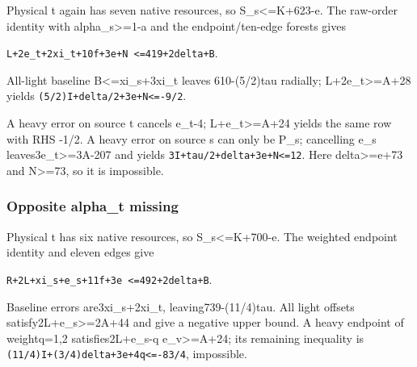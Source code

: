 \documentclass[10pt,a4paper]{article}
\theoremstyle{definition}
\begin{document}
Physical t again has seven native resources,\allowbreak{} so S\_\allowbreak{}s\textless=\allowbreak{}K+\allowbreak{}623-e.
The raw-order identity with alpha\_\allowbreak{}s\textgreater=\allowbreak{}1-a and the
endpoint/ten-edge forests gives

\texttt{L+\allowbreak{}2e\_\allowbreak{}\allowbreak{}t+\allowbreak{}2xi\_\allowbreak{}\allowbreak{}t+\allowbreak{}10f+\allowbreak{}3e+\allowbreak{}N <=\allowbreak{}419+\allowbreak{}2delta+\allowbreak{}B}.

All-light baseline B\textless=\allowbreak{}xi\_\allowbreak{}s+\allowbreak{}3xi\_\allowbreak{}t leaves 610-(5/2)tau radially;
L+\allowbreak{}2e\_\allowbreak{}t\textgreater=\allowbreak{}A+\allowbreak{}28 yields
\texttt{(5/\allowbreak{}2)I+\allowbreak{}delta/\allowbreak{}2+\allowbreak{}3e+\allowbreak{}N<=\allowbreak{}-9/\allowbreak{}2}.

A heavy error on source t cancels e\_\allowbreak{}t-4; L+\allowbreak{}e\_\allowbreak{}t\textgreater=\allowbreak{}A+\allowbreak{}24 yields
the same row with RHS -1/2. A heavy error on source s can only be P\_\allowbreak{}s;
cancelling e\_\allowbreak{}s leaves3e\_\allowbreak{}t\textgreater=\allowbreak{}3A-207 and yields
\texttt{3I+\allowbreak{}tau/\allowbreak{}2+\allowbreak{}delta+\allowbreak{}3e+\allowbreak{}N<=\allowbreak{}12}. Here
delta\textgreater=\allowbreak{}e+\allowbreak{}73 and N\textgreater=\allowbreak{}73,\allowbreak{} so it is impossible.

\hypertarget{opposite-alpha_t-missing}{%
\subsubsection{Opposite alpha\_\allowbreak{}t
missing}\label{opposite-alpha_t-missing}}

Physical t has six native resources,\allowbreak{} so S\_\allowbreak{}s\textless=\allowbreak{}K+\allowbreak{}700-e. The
weighted endpoint identity and eleven edges give

\texttt{R+\allowbreak{}2L+\allowbreak{}xi\_\allowbreak{}\allowbreak{}s+\allowbreak{}e\_\allowbreak{}\allowbreak{}s+\allowbreak{}11f+\allowbreak{}3e <=\allowbreak{}492+\allowbreak{}2delta+\allowbreak{}B}.

Baseline errors are3xi\_\allowbreak{}s+\allowbreak{}2xi\_\allowbreak{}t,\allowbreak{} leaving739-(11/4)tau. All light
offsets satisfy2L+\allowbreak{}e\_\allowbreak{}s\textgreater=\allowbreak{}2A+\allowbreak{}44 and give a negative upper
bound. A heavy endpoint of weightq=\allowbreak{}1,\allowbreak{}2 satisfies2L+\allowbreak{}e\_\allowbreak{}s-q
e\_\allowbreak{}v\textgreater=\allowbreak{}A+\allowbreak{}24; its remaining inequality is
\texttt{(11/\allowbreak{}4)I+\allowbreak{}(3/\allowbreak{}4)delta+\allowbreak{}3e+\allowbreak{}4q<=\allowbreak{}-83/\allowbreak{}4},\allowbreak{} impossible.
\end{document}
